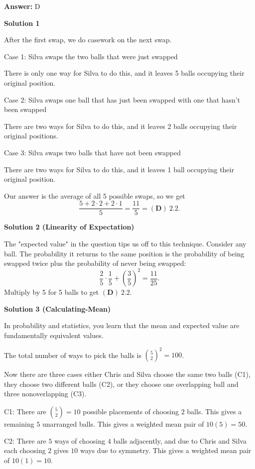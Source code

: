 \begin{enumerate}
 \textbf{Answer: }D



\textbf{Solution 1}

After the first swap, we do casework on the next swap.

 
Case 1: Silva swaps the two balls that were just swapped

 There is only one way for Silva to do this, and it leaves 5 balls occupying their original position.

 
Case 2: Silva swaps one ball that has just been swapped with one that hasn't been swapped

 There are two ways for Silva to do this, and it leaves 2 balls occupying their original positions.

 
Case 3: Silva swaps two balls that have not been swapped

 There are two ways for Silva to do this, and it leaves 1 ball occupying their original position.

 
Our answer is the average of all 5 possible swaps, so we get 
 \[\frac{5+2\cdot2+2\cdot1}{5}=\frac{11}5=\boxed{(\textbf{D}) \: 2.2}.\]




\textbf{Solution 2 (Linearity of Expectation)}

The "expected value" in the question tips us off to this technique. Consider any ball. The probability it returns to the same position is the probability of being swapped twice plus the probability of never being swapped: 
 \[\frac{2}{5} \cdot \frac{1}{5} + \left(\frac{3}{5}\right)^2 = \frac{11}{25}.\] Multiply by 5 for 5 balls to get $\boxed{(\textbf{D}) \: 2.2}.$




\textbf{Solution 3 (Calculating-Mean)}

In probability and statistics, you learn that the mean and expected value are fundamentally equivalent values.

 The total number of ways to pick the balls is ${5 \choose 2}^2 = 100$.

 Now there are three cases either Chris and Silva choose the same two balls (C1), they choose two different balls (C2), or they choose one overlapping ball and three nonoverlapping (C3).

 C1: There are ${5 \choose 2} = 10$ possible placements of choosing $2$ balls. This gives a remaining $5$ unarranged balls. This gives a weighted mean pair of $10(5) = 50$.

 C2: There are $5$ ways of choosing $4$ balls adjacently, and due to Chris and Silva each choosing $2$ gives $10$ ways due to symmetry. This gives a weighted mean pair of $10(1) = 10$.


\end{enumerate}
